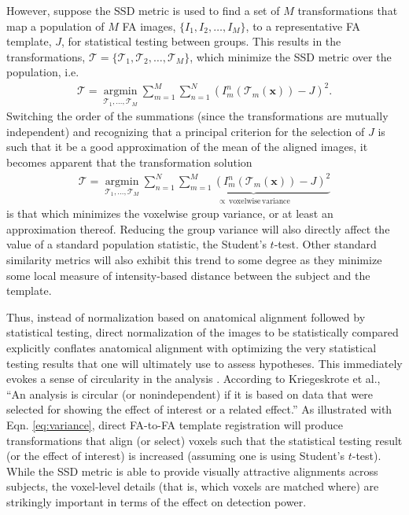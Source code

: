 \documentclass[final,5p,times,twocolumn]{elsarticle}
\begin{document}
However, suppose the SSD metric is used to find a set of $M$ transformations that map a population of $M$ FA images, $\{I_1, I_2, \ldots, I_M\}$, to a representative FA template, $J$, for statistical testing between groups. This results in the transformations,
$\boldsymbol{\mathcal{T}} = \{\mathcal{T}_1, \mathcal{T}_2,\ldots,\mathcal{T}_M \}$, which minimize the SSD metric over the population, i.e.
\begin{align}
  \boldsymbol{\mathcal{T}} = \underset{\mathcal{T}_1, \ldots, \mathcal{T}_M}{\operatorname{argmin}}
    \sum_{m=1}^M\sum_{n=1}^N \left( I^n_m( \mathcal{T}_m(\mathbf{x}) ) - J \right)^2.
\end{align}
Switching the order of the summations (since the transformations are mutually independent) and recognizing that a principal criterion for the selection of $J$ is such that it be a good approximation of the mean of the aligned images, it becomes apparent that the transformation solution
\begin{align}\label{eq:variance}
  \boldsymbol{\mathcal{T}} = \underset{\mathcal{T}_1, \ldots, \mathcal{T}_M}{\operatorname{argmin}}
    \sum_{n=1}^N \underbrace{\sum_{m=1}^M \left( I^n_m( \mathcal{T}_m(\mathbf{x}) ) - J \right)^2}_{
    \propto\mathrm{\,voxelwise\,variance}}
\end{align}
is that which minimizes the voxelwise group variance, or at least an approximation thereof.  Reducing the group variance will also directly affect the value of a standard population statistic, the Student's $t$-test.  Other standard similarity metrics will also exhibit this
trend to some degree as they minimize some local measure of intensity-based distance between the subject and the template.  

Thus, instead of normalization based on anatomical alignment followed by
statistical testing, direct normalization of the images to be statistically compared 
explicitly conflates
anatomical alignment with optimizing the very statistical testing
results that one will ultimately use to assess hypotheses.  This immediately evokes a sense of circularity in the analysis \citep{Kriegeskorte2010}.
According to Kriegeskrote et al., ``An analysis is circular (or nonindependent) if it is based on data that were selected for showing the effect of interest or a related effect.''  As illustrated with
Eqn. \ref{eq:variance}, direct FA-to-FA template registration will produce transformations that align (or select) voxels such that the statistical testing result (or the effect of interest) is increased (assuming one is using Student's 
$t$-test).  While the SSD metric is able to provide visually attractive alignments across subjects, the voxel-level details (that is, which voxels are matched where) are strikingly important in terms of the effect on detection power.  
\end{document}
